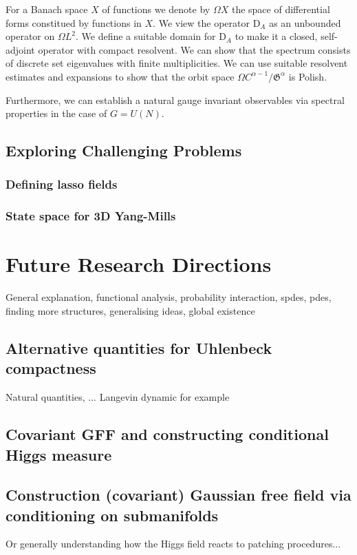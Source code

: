 \documentclass[11pt]{article}
\numberwithin{equation}{section}
\theoremstyle{definition}
\theoremstyle{remark}
\newcommand{\1}{\mathbf 1}
\newcommand{\<}{\langle}
\renewcommand{\>}{\rangle}
\newcommand{\rmD}{\mathrm{D}}
\begin{document}
For a Banach space $X$ of functions we denote by $\Omega X$ the space of differential forms constitued by functions in $X$. We view the operator $\rmD_A$ as an unbounded operator on $\Omega L^2$. We define a suitable domain for $\rmD_A$ to make it a closed, self-adjoint operator with compact resolvent. We can show that the spectrum consists of discrete set eigenvalues with finite multiplicities. We can use suitable resolvent estimates and expansions to show that the orbit space $\Omega C^{\alpha-1}/\mathfrak G^\alpha$ is Polish.

Furthermore, we can establish a natural gauge invariant observables via spectral properties  in the case of $G=U(N)$.  

\subsection{Exploring Challenging Problems}
\subsubsection{Defining lasso fields}
\subsubsection{State space for 3D Yang-Mills}


\section{Future Research Directions}
General explanation, functional analysis, probability interaction, spdes, pdes, finding more structures, generalising ideas, global existence 

\subsection{Alternative quantities for Uhlenbeck compactness}

Natural quantities, ... Langevin dynamic for example

\subsection{Covariant GFF and constructing conditional Higgs measure}



\subsection{Construction (covariant) Gaussian free field via conditioning on submanifolds}
Or generally understanding how the Higgs field reacts to patching procedures... 
\end{document}
